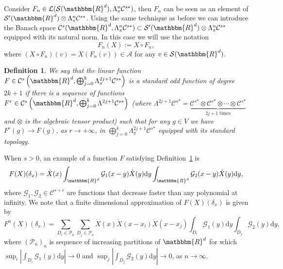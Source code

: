 \documentclass[11pt]{article}
\newcommand{\assign}{:=}
\newcommand{\asterisk}{\mathord{*}}
\newcommand{\mathd}{\mathrm{d}}
\newtheorem{definition}{Definition}
\begin{document}
\

Consider $F_n \in \mathcal{L} (\mathcal{S} (\mathbbm{R}^d), \Lambda^n_{\pi}
\mathcal{C}^{s \asterisk})$, then $F_n$ can be seen as an element of
$\mathcal{S}' (\mathbbm{R}^d) \otimes \Lambda^n_{\pi} \mathcal{C}^{s
\asterisk}$. Using the same technique as before we can introduce the Banach
space $\mathcal{C}^s (\mathbbm{R}^d, \Lambda^n_{\pi} \mathcal{C}^{s \asterisk})
\subset \mathcal{S}' (\mathbbm{R}^d) \otimes \Lambda^n_{\pi} \mathcal{C}^{s
\asterisk}$ equipped with its natural norm. In this case we will use the
notation
\begin{equation}
  F_n (X) \assign X \circ F_n, \label{eq:composition}
\end{equation}
where $(X \circ F_n) (v) = X (F_n (v)) \in \mathcal{A}$ for any $v \in
\mathcal{S} (\mathbbm{R}^d)$.

\begin{definition}
  \label{definition-F1}We say that the linear function $F \in \mathcal{C}^s
  \left( \mathbbm{R}^d, \bigoplus_{j = 0}^k \Lambda^{2 j + 1}_{\pi}
  \mathcal{C}^{s \asterisk} \right)$ is a standard odd function of degree $2 k
  + 1$ if there is a sequence of functions $F^r \in \mathcal{C}^s \left(
  \mathbbm{R}^d, \bigoplus_{j = 0}^k \Lambda^{2 j + 1} \mathcal{C}^{s
  \asterisk} \right)$ (where $\Lambda^{2 j + 1} \mathcal{C}^{s \asterisk} =
  \underbrace{\mathcal{C}^{s \asterisk} \otimes \mathcal{C}^{s \asterisk}
  \otimes \cdots \otimes \mathcal{C}^{s \asterisk}}_{\text{$2 j + 1$ times}}$
  and $\otimes$ is the algebraic tensor product) such that for any $g \in V$
  we have $F^r (g) \rightarrow F (g)$, as $r \rightarrow + \infty$, in
  $\bigoplus_{j = 0}^k \Lambda^{2 j + 1}_{\pi} \mathcal{C}^{s \asterisk}$
  equipped with its standard topology.
\end{definition}

\begin{remark}
  \label{rem:discr}When $s > 0$, an example of a function $F$ satisfying
  Definition~\ref{definition-F1} is
  \[ F (X) (\delta_x) = \dot{X} (x) \int_{\mathbbm{R}^d} \mathcal{G}_1 (x - y)
     \dot{X} (y) \mathd y \int_{\mathbbm{R}^d} \mathcal{G}_2 (x - y) \dot{X}
     (y) \mathd y, \]
  where $\mathcal{G}_1, \mathcal{G}_2 \in \mathcal{C}^{s + \epsilon}$ are
  functions that decrease faster than any polynomial at infinity. We note that
  a finite dimensional approximation of $F (X) (\delta_x)$ is given by
  \[ F^n (X) (\delta_x) = \sum_{D_i \in \mathcal{P}_n} \sum_{D_j \in
     \mathcal{P}_n} \dot{X} (x) \dot{X} (x - x_i) \dot{X} (x - x_j) \int_{D_i}
     \mathcal{G}_1 (y) \mathd y \int_{D_j} \mathcal{G}_2 (y) \mathd y, \]
  where $(\mathcal{P}_n)_n$ is sequence of increasing partitions of
  $\mathbbm{R}^d$ for which $\sup_i \left| \int_{D_i} \mathcal{G}_1 (y) \mathd
  y \right| \rightarrow 0$ and $\sup_j \left| \int_{D_j} \mathcal{G}_2 (y)
  \mathd y \right| \rightarrow 0$, as $n \rightarrow \infty$.
\end{remark}
\end{document}
